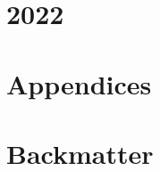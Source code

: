 \part{2022}
\setcounter{chapter}{0}













\part{Appendices}
\appendix

%
% 
% 
%
% 
% 
% 
% 
% 
% 
% 
% 
%  
% 
% 
% 
% 
% 
% 
\part{Backmatter}
\backmatter %

\printindex

